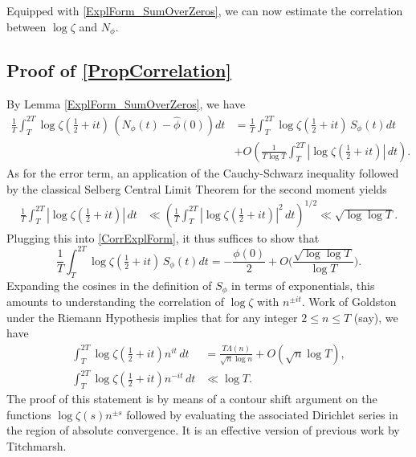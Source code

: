 \documentclass[12pt,oneside,english,a4paper]{amsart}
\theoremstyle{remark}
\numberwithin{equation}{section}
\begin{document}
Equipped with \cref{ExplForm_SumOverZeros}, we can now estimate the correlation between $\log \zeta$ and $N_\phi$.

\subsection*{Proof of \texorpdfstring{\cref{PropCorrelation}}{PropCorrelation}}
    By Lemma \ref{ExplForm_SumOverZeros}, we have
    \begin{equation}\begin{split}\label{CorrExplForm} \frac{1}{T}\int_{T}^{2T} \log \zeta(\tfrac{1}{2}+it) \, \left(N_\phi(t) - \hat\phi(0)\right) dt &= \frac{1}{T}\int_{T}^{2T} \log \zeta(\tfrac{1}{2}+it) \, S_\phi(t) dt \\ &+ O \left( \frac{1}{T \log T} \int_T^{2 T} | \log \zeta (\tfrac{1}{2}+it) | \, dt \right). \end{split}\end{equation}
    As for the error term, an application of the Cauchy-Schwarz inequality followed by the classical Selberg Central Limit Theorem for the second moment yields
    \begin{equation*}
        \begin{split}
            \frac{1}{T} \int_T^{2 T} | \log \zeta (\tfrac{1}{2}+it) | \, dt &\ll \left( \frac{1}{T} \int_T^{2 T} | \log \zeta (\tfrac{1}{2}+it) |^2 \, dt \right)^{1/2} \ll \sqrt{\log \log T}.
        \end{split}
    \end{equation*}
    Plugging this into \eqref{CorrExplForm}, it thus suffices to show that
    \begin{equation}\label{CorrSTS}
        \frac{1}{T}\int_{T}^{2T} \log \zeta(\tfrac{1}{2}+it) \, S_\phi(t) dt 
        = -\frac{\phi(0)}{2}+O\bigg(\frac{\sqrt{\log\log T}}{\log T}\bigg).
    \end{equation}
    Expanding the cosines in the definition of $S_\phi$ in terms of exponentials, this amounts to understanding the correlation of $\log \zeta$ with $n^{\pm i t}$.
    Work of Goldston \cite[p. 169]{Goldston1} under the Riemann Hypothesis implies that for any integer $2 \le n \le T$  (say), we have
    \begin{equation}\label{GoldstonEst}
        \begin{split}
            \int_T^{2 T} \log \zeta(\tfrac{1}{2}+it) n^{i t} \, dt &= \frac{T \Lambda(n)}{\sqrt{n} \log n} + O \left( \sqrt{n} \log T \right), \\
            \int_T^{2 T} \log \zeta(\tfrac{1}{2}+it) n^{-i t} \, dt &\ll \log T.
        \end{split}
    \end{equation}
    The proof of this statement is by means of a contour shift argument on the functions $\log \zeta(s) n^{\pm s}$ followed by evaluating the associated Dirichlet series in the region of absolute convergence. It is an effective version of previous work \cite{Titchmarsh1} by Titchmarsh.
\end{document}

